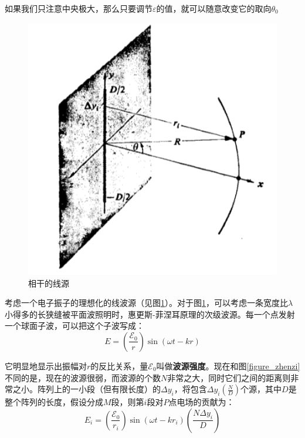 \documentclass[UTF8]{ctexart}
\begin{document}
\noindent 	如果我们只注意中央极大，那么只要调节$ \varepsilon $的值，就可以随意改变它的取向$ \theta_{0} $

	\begin{figure}[ht]
		\centering
		\includegraphics[width=12cm]{Diffraction_line_light.png}
		\caption{相干的线源}
		\label{figure_line}
	\end{figure}

	考虑一个电子振子的理想化的线波源（见图\ref{figure_line}）。对于图\ref{figure_line}，可以考虑一条宽度比$ \lambda $小得多的长狭缝被平面波照明时，惠更斯-菲涅耳原理的次级波源。每一个点发射一个球面子波，可以把这个子波写成：	
\begin{equation}
E=\left(\frac{\mathscr{E}_{0}}{r}\right) \sin (\omega t-k r)
\end{equation}

\noindent 它明显地显示出振幅对$ r $的反比关系，量$ \mathscr{E}_{0} $叫做\textbf{波源强度}。现在和图\ref{figure_zhenzi}不同的是，现在的波源很弱，而波源的个数$ N $非常之大，同时它们之间的距离则非常之小。阵列上的一小段（但有限长度）的$ \Delta y_{i} $，将包含$ \Delta y_{i} \left(\frac{N}{D}\right) $个源，其中$ D $是整个阵列的长度，假设分成$ M $段，则第$ i $段对$ P $点电场的贡献为：
\begin{equation}
E_{i}=\left(\frac{\mathscr{E}_{0}}{r_{i}}\right) \sin \left(\omega t-k r_{i}\right)\left(\frac{N \Delta y_{i}}{D}\right)
\end{equation}
\end{document}
